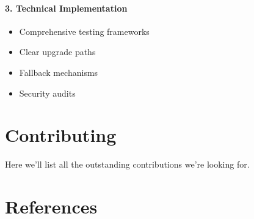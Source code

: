 \documentclass[
  letterpaper,
  DIV=11,
  numbers=noendperiod]{scrreprt}
\providecommand{\tightlist}{%
  \setlength{\itemsep}{0pt}\setlength{\parskip}{0pt}}\usepackage{longtable,booktabs,array}
\begin{document}
\subsubsection{3. Technical
Implementation}\label{technical-implementation}

\begin{itemize}
\tightlist
\item
  Comprehensive testing frameworks
\item
  Clear upgrade paths
\item
  Fallback mechanisms
\item
  Security audits
\end{itemize}


\chapter{Contributing}\label{contributing}

Here we'll list all the outstanding contributions we're looking for.


\chapter*{References}\label{references}

\end{document}
